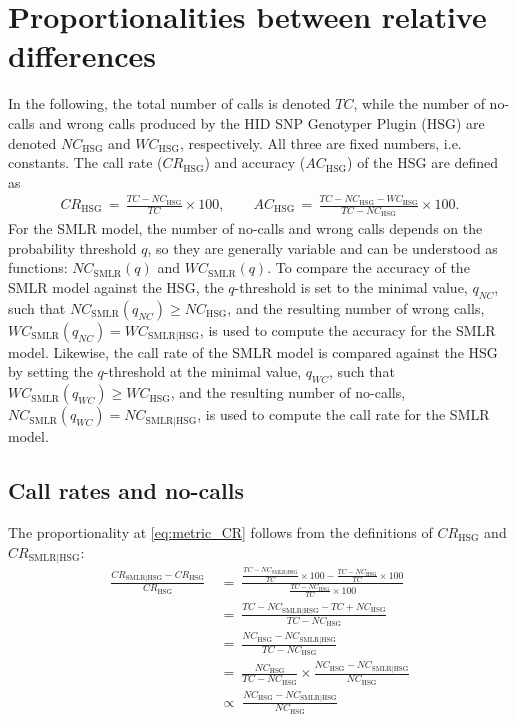 \documentclass[preprint,5p,times,11pt]{elsarticle}
\begin{document}
\section*{Proportionalities between relative differences}
In the following, the total number of calls is denoted $TC$, while the number of no-calls and wrong calls produced by the HID SNP Genotyper Plugin (HSG) are denoted $NC_{\text{HSG}}$ and $WC_{\text{HSG}}$, respectively.
All three are fixed numbers, i.e. constants.
The call rate ($CR_{\text{HSG}}$) and accuracy ($AC_{\text{HSG}}$) of the HSG are defined as
\begin{align*}
CR_{\text{HSG}} \, = \, \frac{TC - NC_{\text{HSG}}}{TC} \times 100, \qquad
AC_{\text{HSG}} \, = \, \frac{TC - NC_{\text{HSG}} - WC_{\text{HSG}}}{TC - NC_{\text{HSG}}} \times 100.
\end{align*}
For the SMLR model, the number of no-calls and wrong calls depends on the probability threshold $q$, so they are generally variable and can be understood as functions: $NC_{\text{SMLR}}(q)$ and $WC_{\text{SMLR}}(q)$.
To compare the accuracy of the SMLR model against the HSG, the $q$-threshold is set to the minimal value, $q_{NC}$, such that $NC_{\text{SMLR}}(q_{NC}) \geq NC_{\text{HSG}}$, and the resulting number of wrong calls, $WC_{\text{SMLR}}(q_{NC}) = WC_{\text{SMLR}\mid\text{HSG}}$, is used to compute the accuracy for the SMLR model.
Likewise, the call rate of the SMLR model is compared against the HSG by setting the $q$-threshold at the minimal value, $q_{WC}$, such that $WC_{\text{SMLR}}(q_{WC}) \geq WC_{\text{HSG}}$, and the resulting number of no-calls, $NC_{\text{SMLR}}(q_{WC}) = NC_{\text{SMLR}\mid\text{HSG}}$, is used to compute the call rate for the SMLR model.

\subsection*{Call rates and no-calls}
The proportionality at \eqref{eq:metric_CR} follows from the definitions of $CR_{\text{HSG}}$ and $CR_{\text{SMLR}\mid\text{HSG}}$:
\begin{align}
\frac{CR_{\text{SMLR}\mid\text{HSG}} - CR_{\text{HSG}}}{CR_{\text{HSG}}}
\ &= \ 
\frac{\frac{TC - NC_{\text{SMLR}\mid\text{HSG}}}{TC} \times 100 - \frac{TC - NC_{\text{HSG}}}{TC} \times 100}{\frac{TC - NC_{\text{HSG}}}{TC} \times 100} \nonumber\\
&= \ 
\frac{TC - NC_{\text{SMLR}\mid\text{HSG}} - TC + NC_{\text{HSG}}}{TC - NC_{\text{HSG}}} \nonumber\\
&= \ 
\frac{NC_{\text{HSG}} - NC_{\text{SMLR}\mid\text{HSG}}}{TC - NC_{\text{HSG}}} \nonumber\\
&= \ 
\frac{NC_{\text{HSG}}}{TC - NC_{\text{HSG}}} \times \frac{NC_{\text{HSG}} - NC_{\text{SMLR}\mid\text{HSG}}}{NC_{\text{HSG}}} \nonumber\\
\; &\propto \; 
\frac{NC_{\text{HSG}} - NC_{\text{SMLR}\mid\text{HSG}}}{NC_{\text{HSG}}}\label{eq:prop_CR}
\end{align}
\end{document}
